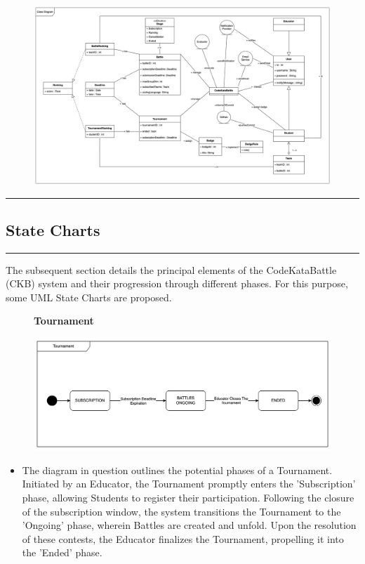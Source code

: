 \documentclass{Configuration_Files/Template}
\begin{document}
\begin{figure}[H]
\includegraphics[scale = 0.45]{Images/ClassDiagram/ClassDiagram.png}\\
\centering
\end{figure}

{\color{bluepoli}\rule{\linewidth}{0.1pt}}

\subsection{State Charts}

{\color{bluepoli}\rule{\linewidth}{0.1pt}}

The subsequent section details the principal elements of the CodeKataBattle (CKB) system and their progression through different phases. For this purpose, some UML State Charts are proposed.

\begin{figure}[H]
\textbf{Tournament}\par\medskip
\includegraphics[scale = 0.45]{Images/StateCharts/TournamentStateDiagram.png}\\
\centering
\end{figure}

\begin{itemize}
\item The diagram in question outlines the potential phases of a Tournament. Initiated by an Educator, the Tournament promptly enters the 'Subscription' phase, allowing Students to register their participation. Following the closure of the subscription window, the system transitions the Tournament to the 'Ongoing' phase, wherein Battles are created and unfold. Upon the resolution of these contests, the Educator finalizes the Tournament, propelling it into the 'Ended' phase.
\end{itemize}
\end{document}
